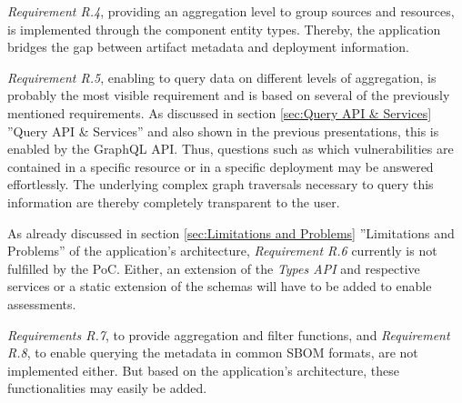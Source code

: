 \emph{Requirement R.4}, providing an aggregation level to group sources and resources, is implemented through the component entity types. Thereby, the application bridges the gap between artifact metadata and deployment information.\par
\emph{Requirement R.5}, enabling to query data on different levels of aggregation, is probably the most visible requirement and is based on several of the previously mentioned requirements. As discussed in section \ref{sec:Query API & Services} ''Query API \& Services'' and also shown in the previous presentations, this is enabled by the GraphQL API. Thus, questions such as which vulnerabilities are contained in a specific resource or in a specific deployment may be answered effortlessly. The underlying complex graph traversals necessary to query this information are thereby completely transparent to the user.\par
As already discussed in section \ref{sec:Limitations and Problems} ''Limitations and Problems'' of the application's architecture, \emph{Requirement R.6} currently is not fulfilled by the PoC. Either, an extension of the \emph{Types API} and respective services or a static extension of the schemas will have to be added to enable assessments.\par
\emph{Requirements R.7}, to provide aggregation and filter functions, and \emph{Requirement R.8}, to enable querying the metadata in common SBOM formats, are not implemented either. But based on the application's architecture, these functionalities may easily be added.\\

